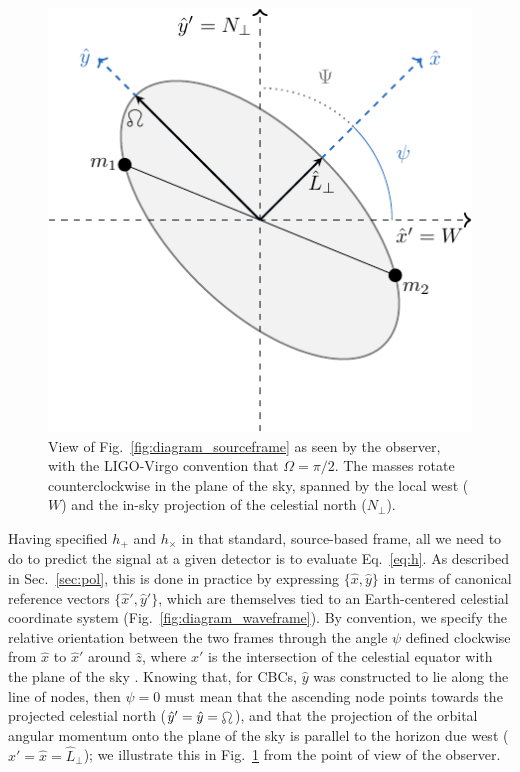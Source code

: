 \documentclass[aps,prd,twocolumn,superscriptaddress,preprintnumbers,floatfix,nofootinbib]{revtex4-2}
\newcommand*{\eq}[1]{Eq.~\eqref{eq:#1}}
\begin{document}
\begin{figure}
\includegraphics[width=0.8\columnwidth]{diagram_skyview.pdf}
\caption{View of Fig.~\ref{fig:diagram_sourceframe} as seen by the observer, with the LIGO-Virgo convention that $\Omega=\pi/2$. The masses rotate counterclockwise in the plane of the sky, spanned by the local west ($W$) and the in-sky projection of the celestial north ($N_\perp$).
}
\label{fig:diagram_skyview}
\end{figure}

Having specified $h_+$ and $h_\times$ in that standard, source-based frame, all we need to do to predict the signal at a given detector is to evaluate \eq{h}.
As described in Sec.~\ref{sec:pol}, this is done in practice by expressing $\{\hat{x}, \hat{y}\}$ in terms of canonical reference vectors $\{\hat{x}',\hat{y}'\}$, which are themselves tied to an Earth-centered celestial coordinate system (Fig.~\ref{fig:diagram_waveframe}).
By convention, we specify the relative orientation between the two frames through the angle $\psi$ defined clockwise from $\hat{x}$ to $\hat{x}'$ around $\hat{z}$, where $\hat{x}'$ is the intersection of the celestial equator with the plane of the sky \cite{LALSuite:wave,Anderson:T010110}.
Knowing that, for CBCs, $\hat{y}$ was constructed to lie along the line of nodes, then $\psi = 0$ must mean that the ascending node points towards the projected celestial north ($\hat{y}'=\hat{y}=\ascnode$), and that the projection of the orbital angular momentum onto the plane of the sky is parallel to the horizon due west ($\hat{x}'=\hat{x}=\hat{L}_\perp$); we illustrate this in Fig.~\ref{fig:diagram_skyview} from the point of view of the observer.
\end{document}
